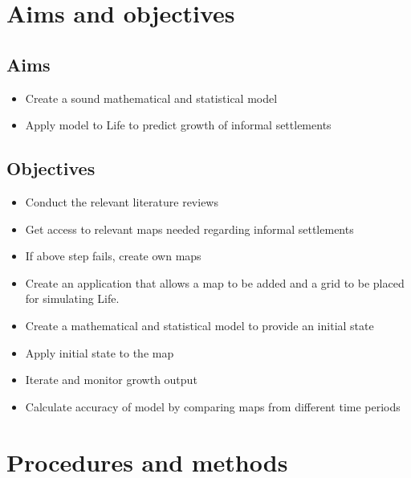 \section{Aims and objectives}
\subsection{Aims}
\begin{itemize}
\item Create a sound mathematical and statistical model
\item Apply model to Life to predict growth of informal settlements
\end{itemize}
\subsection{Objectives}
\begin{itemize}
\item Conduct the relevant literature reviews
\item Get access to relevant maps needed regarding informal settlements
\item If above step fails, create own maps
\item Create an application that allows a map to be added and a grid to be placed for simulating Life.
\item Create a mathematical and statistical model to provide an initial state
\item Apply initial state to the map
\item Iterate and monitor growth output
\item Calculate accuracy of model by comparing maps from different time periods
\end{itemize}
\section{Procedures and methods}

